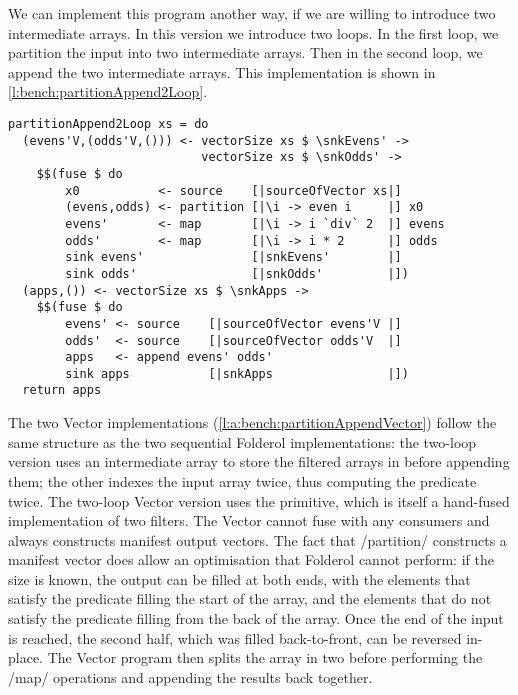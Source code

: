 We can implement this program another way, if we are willing to introduce two intermediate arrays.
In this version we introduce two loops.
In the first loop, we partition the input into two intermediate arrays.
Then in the second loop, we append the two intermediate arrays.
This implementation is shown in \cref{l:bench:partitionAppend2Loop}.

\begin{lstlisting}[float,label=l:bench:partitionAppend2Loop,caption=Partition / append with two loops]
partitionAppend2Loop xs = do
  (evens'V,(odds'V,())) <- vectorSize xs $ \snkEvens' ->
                           vectorSize xs $ \snkOdds' ->
    $$(fuse $ do
        x0           <- source    [|sourceOfVector xs|]
        (evens,odds) <- partition [|\i -> even i     |] x0
        evens'       <- map       [|\i -> i `div` 2  |] evens
        odds'        <- map       [|\i -> i * 2      |] odds
        sink evens'               [|snkEvens'        |]
        sink odds'                [|snkOdds'         |])
  (apps,()) <- vectorSize xs $ \snkApps ->
    $$(fuse $ do
        evens' <- source    [|sourceOfVector evens'V |]
        odds'  <- source    [|sourceOfVector odds'V  |]
        apps   <- append evens' odds'
        sink apps           [|snkApps                |])
  return apps
\end{lstlisting}

The two Vector implementations (\cref{l:a:bench:partitionAppendVector}) follow the same structure as the two sequential Folderol implementations: the two-loop version uses an intermediate array to store the filtered arrays in before appending them; the other indexes the input array twice, thus computing the predicate twice.
The two-loop Vector version uses the \Hs@partition@ primitive, which is itself a hand-fused implementation of two filters.
The Vector \Hs@partition@ cannot fuse with any consumers and always constructs manifest output vectors.
The fact that \Hs/partition/ constructs a manifest vector does allow an optimisation that Folderol cannot perform: if the size is known, the output can be filled at both ends, with the elements that satisfy the predicate filling the start of the array, and the elements that do not satisfy the predicate filling from the back of the array.
Once the end of the input is reached, the second half, which was filled back-to-front, can be reversed in-place.
The Vector program then splits the array in two before performing the \Hs/map/ operations and appending the results back together.

